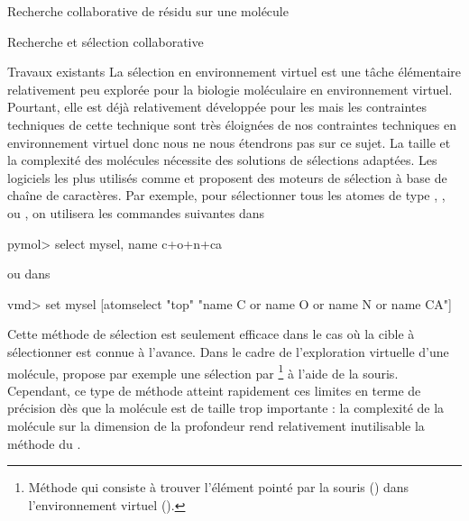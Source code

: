\documentclass[myfrancais]{mythesis}
\begin{document}
\begin{mychapter}{Recherche collaborative de résidu sur une molécule}
\begin{mysection}{Recherche et sélection collaborative}
\begin{mysubsection}{Travaux existants}
				La sélection en environnement virtuel est une tâche élémentaire relativement peu explorée pour la biologie moléculaire en environnement virtuel.
				Pourtant, elle est déjà relativement développée pour les  mais les contraintes techniques de cette technique sont très éloignées de nos contraintes techniques en environnement virtuel donc nous ne nous étendrons pas sur ce sujet.
				La taille et la complexité des molécules nécessite des solutions de sélections adaptées.
				Les logiciels les plus utilisés comme \myPyMOL et  proposent des moteurs de sélection à base de chaîne de caractères.
				Par exemple, pour sélectionner tous les atomes de type , ,  ou , on utilisera les commandes suivantes dans \myPyMOL
				\begin{mySource*}[language={}]
pymol> select mysel, name c+o+n+ca
				\end{mySource*}
				ou dans 
				\begin{mySource*}[language={}]
vmd> set mysel [atomselect "top" "name C or name O or name N or name CA"]
				\end{mySource*}
				Cette méthode de sélection est seulement efficace dans le cas où la cible à sélectionner est connue à l'avance.
				Dans le cadre de l'exploration virtuelle d'une molécule,  propose par exemple une sélection par \footnote{Méthode qui consiste à trouver l'élément pointé par la souris (\myTwoD) dans l'environnement virtuel (\myThreeD).} à l'aide de la souris.
				Cependant, ce type de méthode atteint rapidement ces limites en terme de précision dès que la molécule est de taille trop importante : la complexité de la molécule sur la dimension de la profondeur rend relativement inutilisable la méthode du .


\end{mysubsection}
\end{mysection}
\end{mychapter}
\end{document}
